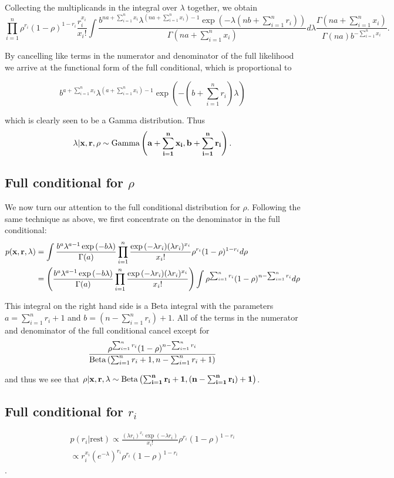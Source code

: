 \documentclass{amsart}
\begin{document}
Collecting the multiplicands in the integral over $\lambda$ together, we obtain
$$
\prod_{i=1}^n \rho^{r_i} (1 - \rho)^{1 - r_i} \frac{r_i^{x_i}}{x_i!}
	\int \frac{b^{na + \sum_{i=1}^n x_i} \lambda^{(na + \sum_{i=1}^n x_i) - 1} \exp{(-\lambda(nb + \sum_{i=1}^n r_i))}}{\Gamma{(na + \sum_{i=1}^n x_i)}} d \lambda
	\frac{\Gamma{(na + \sum_{i=1}^n x_i)}}{\Gamma{(na)} b^{-\sum_{i=1}^n x_i}}.
$$

By cancelling like terms in the numerator and denominator of the full likelihood we arrive 
at the functional form of the full conditional, which is proportional to

$$
b^{a+\sum_{i=1}^n x_i} \lambda^{(a + \sum_{i=1}^n x_i) - 1} \exp{\left(-(b + \sum_{i=1}^n r_i) \lambda \right)}
$$

\noindent which is clearly seen to be a Gamma distribution. Thus
$$
\lambda | \bf x, \bf r, \rho \sim \text{Gamma} \left( a + \sum_{i=1}^n x_i, b + \sum_{i=1}^n r_i \right).
$$

\subsection{Full conditional for $\rho$}
We now turn our attention to the full conditional distribution for $\rho$. Following the same
technique as above, we first concentrate on the denominator in the full conditional:
\begin{align*}
p(\bf x, \bf r, \lambda) &= \int \frac{b^a \lambda^{a - 1} \exp{(-b \lambda)}}{\Gamma{(a)}} \prod_{i=1}^n \frac{\exp{(-\lambda r_i)} (\lambda r_i)^{x_i}}{x_i !} \rho^{r_i} (1 - \rho)^{1 - r_i} d \rho \\
&= \left(\frac{b^a \lambda^{a - 1} \exp{(-b \lambda)}}{\Gamma{(a)}} \prod_{i=1}^n \frac{\exp{(-\lambda r_i)} (\lambda r_i)^{x_i}}{x_i !} \right) \int \rho^{\sum_{i=1}^n r_i} (1 - \rho)^{n - \sum_{i=1}^n r_i} d \rho
\end{align*}

This integral on the right hand side is a Beta integral with the parameters
$a = \sum_{i=1}^n r_i + 1$ and $b = (n - \sum_{i=1}^n r_i) + 1$. All of the terms in the numerator and 
denominator of the full conditional cancel except for
$$
\frac{\rho^{\sum_{i=1}^n r_i} (1 - \rho)^{n - \sum_{i=1}^n r_i}}{\text{Beta} \left( \sum_{i=1}^n r_i + 1, n - \sum_{i=1}^n r_i + 1 \right)}
$$

and thus we see that $\rho | \bf x, \bf r, \lambda \sim \text{Beta} \left( \sum_{i=1}^n r_i + 1, (n - \sum_{i=1}^n r_i) + 1 \right)$.

\subsection{Full conditional for $r_i$}
\begin{align*}
p(r_i | \text{rest}) \propto \frac{(\lambda r_i)^{x_i} \exp{(-\lambda r_i)}}{x_i !} \rho^{r_i} (1 - \rho)^{1 - r_i} \\
\propto r_i^{x_i} (e^{-\lambda})^{r_i} \rho^{r_i} (1 - \rho)^{1 - r_i}
\end{align*}.
\end{document}

